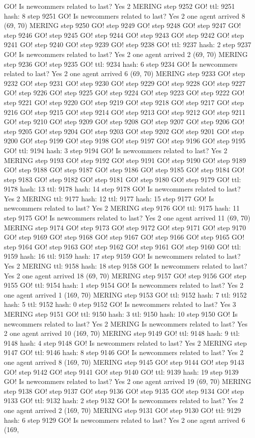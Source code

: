 GO! Is newcommers related to last? Yes 2 MERING step 9252 GO! ttl: 9251 hash: 8 step 9251 GO! Is newcommers related to last? Yes 2 one agent arrived 8 (69, 70) MERING step 9250 GO! step 9249 GO! step 9248 GO! step 9247 GO! step 9246 GO! step 9245 GO! step 9244 GO! step 9243 GO! step 9242 GO! step 9241 GO! step 9240 GO! step 9239 GO! step 9238 GO! ttl: 9237 hash: 2 step 9237 GO! Is newcommers related to last? Yes 2 one agent arrived 2 (69, 70) MERING step 9236 GO! step 9235 GO! ttl: 9234 hash: 6 step 9234 GO! Is newcommers related to last? Yes 2 one agent arrived 6 (69, 70) MERING step 9233 GO! step 9232 GO! step 9231 GO! step 9230 GO! step 9229 GO! step 9228 GO! step 9227 GO! step 9226 GO! step 9225 GO! step 9224 GO! step 9223 GO! step 9222 GO! step 9221 GO! step 9220 GO! step 9219 GO! step 9218 GO! step 9217 GO! step 9216 GO! step 9215 GO! step 9214 GO! step 9213 GO! step 9212 GO! step 9211 GO! step 9210 GO! step 9209 GO! step 9208 GO! step 9207 GO! step 9206 GO! step 9205 GO! step 9204 GO! step 9203 GO! step 9202 GO! step 9201 GO! step 9200 GO! step 9199 GO! step 9198 GO! step 9197 GO! step 9196 GO! step 9195 GO! ttl: 9194 hash: 3 step 9194 GO! Is newcommers related to last? Yes 2 MERING step 9193 GO! step 9192 GO! step 9191 GO! step 9190 GO! step 9189 GO! step 9188 GO! step 9187 GO! step 9186 GO! step 9185 GO! step 9184 GO! step 9183 GO! step 9182 GO! step 9181 GO! step 9180 GO! step 9179 GO! ttl: 9178 hash: 13 ttl: 9178 hash: 14 step 9178 GO! Is newcommers related to last? Yes 2 MERING ttl: 9177 hash: 12 ttl: 9177 hash: 15 step 9177 GO! Is newcommers related to last? Yes 2 MERING step 9176 GO! ttl: 9175 hash: 11 step 9175 GO! Is newcommers related to last? Yes 2 one agent arrived 11 (69, 70) MERING step 9174 GO! step 9173 GO! step 9172 GO! step 9171 GO! step 9170 GO! step 9169 GO! step 9168 GO! step 9167 GO! step 9166 GO! step 9165 GO! step 9164 GO! step 9163 GO! step 9162 GO! step 9161 GO! step 9160 GO! ttl: 9159 hash: 16 ttl: 9159 hash: 17 step 9159 GO! Is newcommers related to last? Yes 2 MERING ttl: 9158 hash: 18 step 9158 GO! Is newcommers related to last? Yes 2 one agent arrived 18 (69, 70) MERING step 9157 GO! step 9156 GO! step 9155 GO! ttl: 9154 hash: 1 step 9154 GO! Is newcommers related to last? Yes 2 one agent arrived 1 (169, 70) MERING step 9153 GO! ttl: 9152 hash: 7 ttl: 9152 hash: 5 ttl: 9152 hash: 0 step 9152 GO! Is newcommers related to last? Yes 3 MERING step 9151 GO! ttl: 9150 hash: 3 ttl: 9150 hash: 10 step 9150 GO! Is newcommers related to last? Yes 2 MERING Is newcommers related to last? Yes 2 one agent arrived 10 (169, 70) MERING step 9149 GO! ttl: 9148 hash: 9 ttl: 9148 hash: 4 step 9148 GO! Is newcommers related to last? Yes 2 MERING step 9147 GO! ttl: 9146 hash: 8 step 9146 GO! Is newcommers related to last? Yes 2 one agent arrived 8 (169, 70) MERING step 9145 GO! step 9144 GO! step 9143 GO! step 9142 GO! step 9141 GO! step 9140 GO! ttl: 9139 hash: 19 step 9139 GO! Is newcommers related to last? Yes 2 one agent arrived 19 (69, 70) MERING step 9138 GO! step 9137 GO! step 9136 GO! step 9135 GO! step 9134 GO! step 9133 GO! ttl: 9132 hash: 2 step 9132 GO! Is newcommers related to last? Yes 2 one agent arrived 2 (169, 70) MERING step 9131 GO! step 9130 GO! ttl: 9129 hash: 6 step 9129 GO! Is newcommers related to last? Yes 2 one agent arrived 6 (169, 